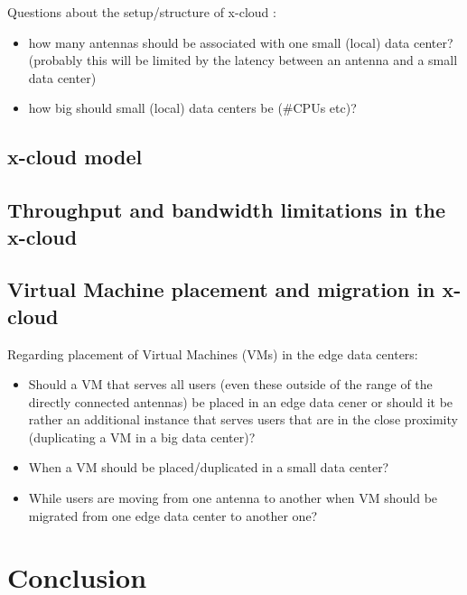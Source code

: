 \documentclass[conference]{IEEEtran}
\newcommand{\xcloud}{x-cloud }
\begin{document}
Questions about the setup/structure of \xcloud:
\begin{itemize}
\item how many antennas should be associated with one small (local) data center? (probably this will be limited by the latency between an antenna and a small data center)
\item how big should small (local) data centers be (\#CPUs etc)?
\end{itemize}

\subsection{\xcloud model}

\subsection{Throughput and bandwidth limitations in the \xcloud}

\subsection{Virtual Machine placement and migration in \xcloud}

Regarding placement of Virtual Machines (VMs) in the edge data centers:
\begin{itemize}
\item Should a VM that serves all users (even these outside of the range of the directly connected antennas) be placed in an edge data cener or should it be rather an additional instance that serves users that are in the close proximity (duplicating a VM in a big data center)?
\item When a VM should be placed/duplicated in a small data center?
\item While users are moving from one antenna to another when VM should be migrated from one edge data center to another one?
\end{itemize}

\section{Conclusion}




\end{document}
